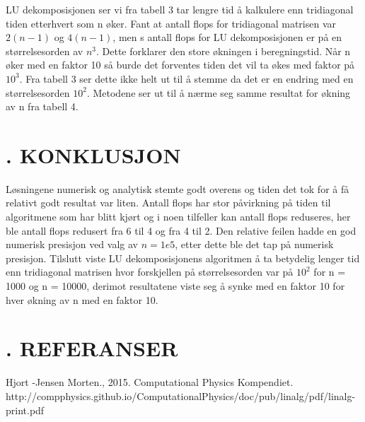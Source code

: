 \documentclass[twocolumn]{article}
\begin{document}
LU dekomposisjonen ser vi fra tabell 3 tar lengre tid å kalkulere enn tridiagonal tiden etterhvert som n øker. Fant at antall flops for tridiagonal matrisen var $2(n-1)$ og $4(n-1)$, men s antall flops for LU dekomposisjonen er på en størrelsesorden av $n^3$. Dette forklarer den store økningen i beregningstid. Når n øker med en faktor 10 så burde det forventes tiden det vil ta økes med faktor på $10^3$. Fra tabell 3 ser dette ikke helt ut til å stemme da det er en endring med en størrelsesorden $10^2$. Metodene ser ut til å nærme seg samme resultat for økning av n fra tabell 4.     
\section*{. KONKLUSJON}
Løsningene numerisk og analytisk stemte godt overens og tiden det tok for å få relativt godt resultat var liten. 
Antall flops har stor påvirkning på tiden til algoritmene som har blitt kjørt og i noen tilfeller kan antall flops reduseres, her ble antall flops redusert fra 6 til 4 og fra 4 til 2.
Den relative feilen hadde en god numerisk presisjon ved valg av $n = 1e5$, etter dette ble det tap på numerisk presisjon. Tilslutt viste LU dekomposisjonens algoritmen å ta betydelig lenger tid enn tridiagonal matrisen hvor forskjellen på størrelsesorden var på $10^2$ for n = 1000 og n = 10000, derimot resultatene viste seg å synke med en faktor 10 for hver økning av n med en faktor 10. 
\newpage

\section*{. REFERANSER}
Hjort -Jensen Morten., 2015. Computational Physics Kompendiet. 
\newline
http://compphysics.github.io/ComputationalPhysics/doc/pub/linalg/pdf/linalg-print.pdf 
\end{document}
